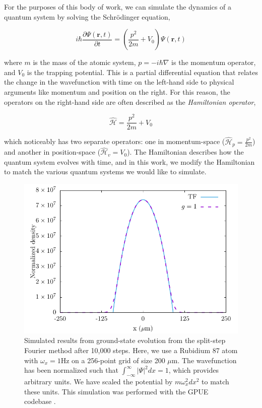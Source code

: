 For the purposes of this body of work, we can simulate the dynamics of a quantum system by solving the Schr\"odinger equation,

\begin{equation}
    i\hbar\frac{\partial\Psi(\mathbf{r},t)}{\partial t} = \left(\frac{p^2}{2m} + V_0\right) \Psi(\mathbf{r},t)
    \label{eqn:schrody}
\end{equation}

\noindent where $m$ is the mass of the atomic system, $p = -i\hbar\nabla$ is the momentum operator, and $V_0$ is the trapping potential.
This is a partial differential equation that relates the change in the wavefunction with time on the left-hand side to physical arguments like momentum and position on the right.
For this reason, the operators on the right-hand side are often described as the \textit{Hamiltonian operator}, 

\begin{equation}
\mathcal{\hat H} = \frac{p^2}{2m} + V_0
\end{equation}

\noindent which noticeably has two separate operators: one in momentum-space ($\mathcal{\hat H}_p = \frac{p^2}{2m}$) and another in position-space ($\mathcal{\hat H}_v = V_0$).
The Hamiltonian describes how the quantum system evolves with time, and in this work, we modify the Hamiltonian to match the various quantum systems we would like to simulate.

\begin{figure}

\includegraphics[width = \textwidth]{data/qs/SHO/SHO.pdf}

\caption{Simulated results from ground-state evolution from the split-step Fourier method after 10,000 steps. Here, we use a Rubidium 87 atom with $\omega_x = 1$Hz on a 256-point grid of size 200 $\mu$m. The wavefunction has been normalized such that $\int_{-\infty}^\infty|\Psi|^2 dx = 1$, which provides arbitrary units. We have scaled the potential by $m \omega_x^2 dx^2$ to match these units. This simulation was performed with the GPUE codebase \cite{schloss2018}.}
\label{fig:SHO}
\end{figure}

